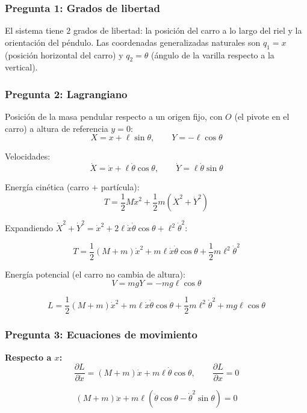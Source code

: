 \begin{sol}

\subsubsection*{Pregunta 1: Grados de libertad}

El sistema tiene $2$ grados de libertad: la posición del carro a lo largo del riel y la orientación del péndulo. Las coordenadas generalizadas naturales son $q_1 = x$ (posición horizontal del carro) y $q_2 = \theta$ (ángulo de la varilla respecto a la vertical).

\subsubsection*{Pregunta 2: Lagrangiano}

Posición de la masa pendular respecto a un origen fijo, con $O$ (el pivote en el carro) a altura de referencia $y=0$:
$$X = x + \ell\sin\theta, \qquad Y = -\ell\cos\theta$$

Velocidades:
$$\dot{X} = \dot{x} + \ell\dot\theta\cos\theta, \qquad \dot{Y} = \ell\dot\theta\sin\theta$$

Energía cinética (carro + partícula):
$$T = \frac{1}{2}M\dot{x}^2 + \frac{1}{2}m\left(\dot{X}^2+\dot{Y}^2\right)$$

Expandiendo $\dot{X}^2+\dot{Y}^2 = \dot{x}^2 + 2\ell\dot{x}\dot\theta\cos\theta + \ell^2\dot\theta^2$:

$$T = \frac{1}{2}(M+m)\dot{x}^2 + m\ell\dot{x}\dot\theta\cos\theta + \frac{1}{2}m\ell^2\dot\theta^2$$

Energía potencial (el carro no cambia de altura):
$$V = mgY = -mg\ell\cos\theta$$

$$\boxed{L = \frac{1}{2}(M+m)\dot{x}^2 + m\ell\dot{x}\dot\theta\cos\theta + \frac{1}{2}m\ell^2\dot\theta^2 + mg\ell\cos\theta}$$

\subsubsection*{Pregunta 3: Ecuaciones de movimiento}

\textbf{Respecto a $x$:}
$$\frac{\partial L}{\partial\dot{x}} = (M+m)\dot{x} + m\ell\dot\theta\cos\theta, \qquad \frac{\partial L}{\partial x} = 0$$

$$\boxed{(M+m)\ddot{x} + m\ell\left(\ddot\theta\cos\theta - \dot\theta^2\sin\theta\right) = 0}$$


\end{sol}
